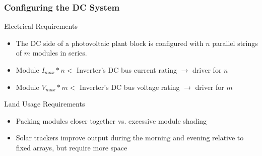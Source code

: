\documentclass[aspectratio=169]{beamer}
\begin{document}
\begin{frame}
  \frametitle{Configuring the DC System}
  \begin{block}{Electrical Requirements}
      \begin{itemize}
      \item The DC side of a photovoltaic plant block is configured
        with $n$ parallel strings of $m$ modules in series.
      \item Module $I_{max} * n <$ Inverter's DC bus current rating
        $\rightarrow$ driver for $n$
      \item Module $V_{max} * m <$ Inverter's DC bus voltage rating
        $\rightarrow$ driver for $m$
      \end{itemize}

  \end{block}
  \begin{block}{Land Usage Requirements}
    \begin{itemize}
    \item Packing modules closer together vs. excessive module shading
    \item Solar trackers improve output during the morning and
      evening relative to fixed arrays, but require more space
    \end{itemize}
  \end{block}
\end{frame}
\end{document}
